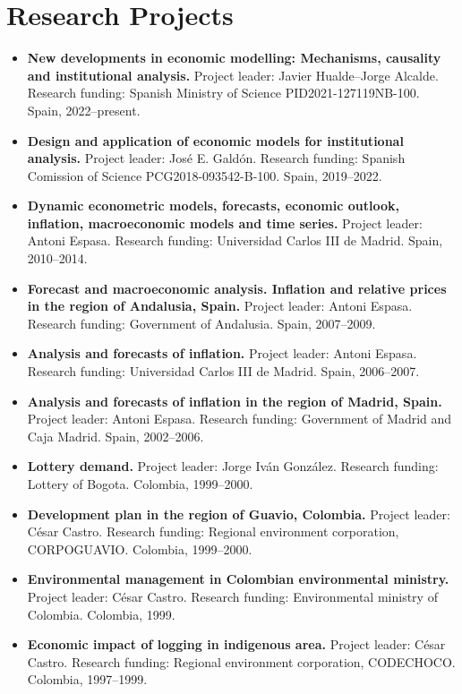 \documentclass[11pt]{article}\usepackage[]{graphicx}\usepackage[usenames,dvipsnames]{xcolor}
\begin{document}
\section{Research Projects}
\begin{itemize}
  \item \textbf{New developments in economic modelling: Mechanisms, causality and institutional analysis.} Project leader: Javier Hualde--Jorge Alcalde. Research funding: Spanish Ministry of Science PID2021-127119NB-100. Spain, 2022--present.
  \item \textbf{Design and application of economic models for institutional analysis.} Project leader: José E. Galdón. Research funding: Spanish Comission of Science PCG2018-093542-B-100. Spain, 2019--2022.
  \item \textbf{Dynamic econometric models, forecasts, economic outlook, inflation, macroeconomic models and time series.} Project leader: Antoni Espasa. Research funding: Universidad Carlos III de Madrid. Spain, 2010--2014.
  \item \textbf{Forecast and macroeconomic analysis. Inflation and relative prices in the region of Andalusia, Spain.} Project leader: Antoni Espasa. Research funding: Government of Andalusia. Spain, 2007--2009.
  \item \textbf{Analysis and forecasts of inflation.} Project leader: Antoni Espasa. Research funding: Universidad Carlos III de Madrid. Spain, 2006--2007.
  \item \textbf{Analysis and forecasts of inflation in the region of Madrid, Spain.} Project leader: Antoni Espasa. Research funding: Government of Madrid and Caja Madrid. Spain, 2002--2006.
  \item \textbf{Lottery demand.} Project leader: Jorge Iván González. Research funding: Lottery of Bogota. Colombia, 1999--2000.
  \item \textbf{Development plan in the region of Guavio, Colombia.} Project leader: César Castro. Research funding: Regional environment corporation, CORPOGUAVIO. Colombia, 1999--2000.
  \item \textbf{Environmental management in Colombian environmental ministry.} Project leader: César Castro. Research funding: Environmental ministry of Colombia. Colombia, 1999.
  \item \textbf{Economic impact of logging in indigenous area.} Project leader: César Castro. Research funding: Regional environment corporation, CODECHOCO. Colombia, 1997--1999.
\end{itemize}
\end{document}
